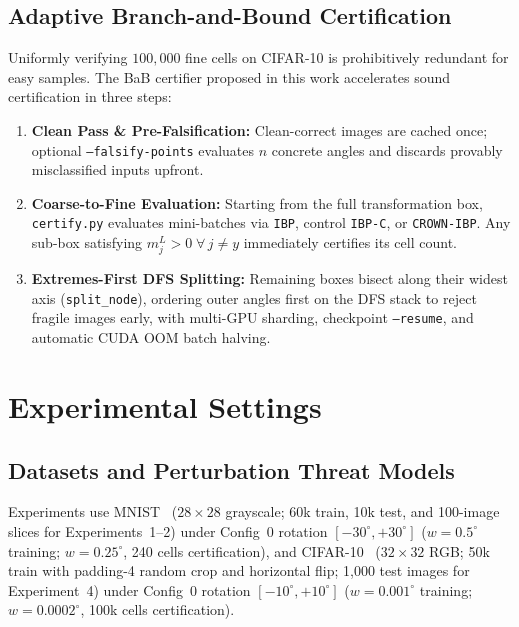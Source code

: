 \documentclass[conference]{IEEEtran}
\begin{document}
\subsection{Adaptive Branch-and-Bound Certification}
Uniformly verifying $100{,}000$ fine cells on CIFAR-10 is prohibitively
redundant for easy samples.
The BaB certifier proposed in this work accelerates sound certification in
three steps:
\vspace{-3pt}
\begin{enumerate}\setlength{\itemsep}{1pt}\setlength{\parskip}{0pt}
  \item \textbf{Clean Pass \& Pre-Falsification:} Clean-correct images are
        cached once; optional \texttt{--falsify-points} evaluates $n$ concrete
        angles and discards provably misclassified inputs upfront.
  \item \textbf{Coarse-to-Fine Evaluation:} Starting from the full
        transformation box, \texttt{certify.py} evaluates mini-batches via
        \texttt{IBP}, control \texttt{IBP-C}, or \texttt{CROWN-IBP}.
        Any sub-box satisfying $m_j^L > 0\;\forall\, j \neq y$
        immediately certifies its cell count.
  \item \textbf{Extremes-First DFS Splitting:} Remaining boxes bisect along
        their widest axis (\texttt{split\_node}), ordering outer angles first
        on the DFS stack to reject fragile images early, with multi-GPU
        sharding, checkpoint \texttt{--resume}, and automatic CUDA OOM batch
        halving.
\end{enumerate}
\vspace{-2pt}

\section{Experimental Settings}

\subsection{Datasets and Perturbation Threat Models}
Experiments use MNIST~\cite{b15} ($28{\times}28$ grayscale; 60k train, 10k
test, and 100-image slices for Experiments~1--2) under Config~0 rotation
$[-30^\circ, +30^\circ]$ ($w = 0.5^\circ$ training;
$w = 0.25^\circ$, 240 cells certification), and CIFAR-10~\cite{b16}
($32{\times}32$ RGB; 50k train with padding-4 random crop and horizontal
flip; 1,000 test images for Experiment~4) under Config~0 rotation
$[-10^\circ, +10^\circ]$ ($w = 0.001^\circ$ training;
$w = 0.0002^\circ$, 100k cells certification).
\end{document}
